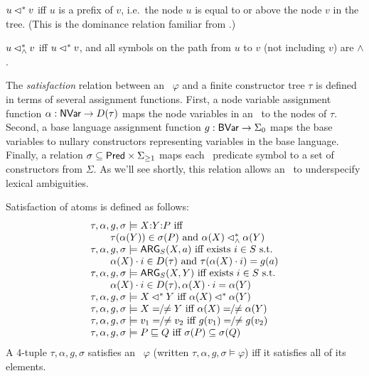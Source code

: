 \begin{definition}\label{defn:dominance}
  $u \lhd^* v$ iff $u$ is a prefix of $v$, i.e.\ the node $u$ is equal
  to or above
  the node $v$ in the tree.  (This is the dominance relation familiar
  from .)

  $u \lhd^*_\wedge v$ iff $u \lhd^* v$, and all symbols on the path from $u$
  to $v$ (not including $v$) are $\wedge$.
\end{definition}

The {\em satisfaction} relation between an \rmrs\ $\varphi$ and a
finite constructor tree $\tau$ is defined in terms of several
assignment functions.  First, a node variable assignment
function $\alpha: \mathsf{NVar} \rightarrow D(\tau)$ maps the node
variables in an \rmrs\ to the nodes of $\tau$.  Second, a
base language assignment function $g:\mathsf{BVar} \rightarrow \Sigma_0$ 
maps the base variables to nullary constructors
representing variables in the base language. Finally, a
relation $\sigma \subseteq \mathsf{Pred} \times \Sigma_{\geq 1}$ maps
each \rmrs\ predicate symbol to a set of constructors from $\Sigma$.
As we'll see shortly, this relation allows an \rmrs\ to underspecify lexical
ambiguities.

\begin{definition}\label{defn:satisfaction}
Satisfaction of atoms is defined as follows:
$$
\begin{array}{l}
  \tau, \alpha, g, \sigma \models  \ep{X}{Y}{P}
\mbox{ iff}\\
\qquad \tau(\alpha(Y)) \in \sigma(P) \mbox{ and } \alpha(X) \wedgedom
  \alpha(Y) \\
  \tau, \alpha, g, \sigma \models \ARG_S(X,a)
\mbox{ iff exists  $i \in S$ s.t.}\\
\qquad  \alpha(X) \cdot i \in D(\tau) \mbox{ and }
  \tau(\alpha(X) \cdot 
  i) = g(a) \\
  \tau, \alpha, g, \sigma \models \ARG_S(X,Y)
\mbox{ iff  exists $i \in S$ s.t.}\\
\qquad \alpha(X) \cdot i \in D(\tau), \alpha(X) \cdot
  i = \alpha(Y)\\
  \tau, \alpha, g, \sigma \models X \dom Y
\mbox{ iff } \alpha(X) \dom \alpha(Y) \\
  \tau, \alpha, g, \sigma \models X =  \!\!/\!\! \neq Y
\mbox{ iff }  \alpha(X) =  \!\!/\!\! \neq \alpha(Y) \\
  \tau, \alpha, g, \sigma \models v_1 =  \!\!/\!\! \neq v_2
\mbox{ iff }  g(v_1) = \!\!/\!\! \neq g(v_2) \\
  \tau, \alpha, g, \sigma \models P \spec Q
\mbox{ iff $\sigma(P) \subseteq \sigma(Q)$}
\end{array}
$$
A 4-tuple $\tau,\alpha,g,\sigma$ satisfies an \rmrs\ $\varphi$
(written $\tau,\alpha,g,\sigma \models \varphi$) iff it satisfies all
of its elements.
\end{definition}

